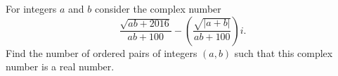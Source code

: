 For integers $a$ and $b$ consider the complex number \[\dfrac{\sqrt{ab+2016}}{ab+100} - \left(\frac{\sqrt{|a+b|}}{ab+100}\right)i.\]Find the number of ordered pairs of integers $(a, b)$ such that this complex number is a real number.